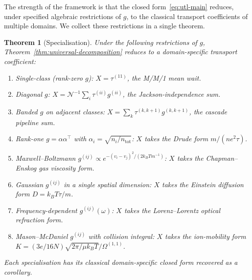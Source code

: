 \documentclass[twocolumn,11pt,a4paper]{article}
\newtheorem{theorem}{Theorem}[section]
\newcommand{\TP}{X}
\newcommand{\Norm}{\mathcal{N}}
\newcommand{\lag}{\tau}
\newcommand{\cpl}{g}
\begin{document}
The strength of the framework is that the closed form~\eqref{eq:utl-main} reduces, under specified algebraic restrictions of $\cpl$, to the classical transport coefficients of multiple domains. We collect these restrictions in a single theorem.

\begin{theorem}[Specialisation]
\label{thm:specialisation}
Under the following restrictions of $\cpl$, Theorem~\ref{thm:universal-decomposition} reduces to a domain-specific transport coefficient:
\begin{enumerate}[nosep,leftmargin=*]
\item Single-class (rank-zero $\cpl$): $\TP = \lag^{(11)}$, the M/M/1 mean wait.
\item Diagonal $\cpl$: $\TP = \Norm^{-1} \sum_i \lag^{(ii)} \cpl^{(ii)}$, the Jackson-independence sum.
\item Banded $\cpl$ on adjacent classes: $\TP = \sum_k \lag^{(k,k+1)} \cpl^{(k,k+1)}$, the cascade pipeline sum.
\item Rank-one $\cpl = \alpha \alpha^\top$ with $\alpha_i = \sqrt{n_i / n_\mathrm{tot}}$: $\TP$ takes the Drude form $m / (n e^2 \tau)$.
\item Maxwell--Boltzmann $\cpl^{(ij)} \propto e^{-(v_i - v_j)^2 / (2 k_B T m^{-1})}$: $\TP$ takes the Chapman--Enskog gas viscosity form.
\item Gaussian $\cpl^{(ij)}$ in a single spatial dimension: $\TP$ takes the Einstein diffusion form $D = k_B T \lag / m$.
\item Frequency-dependent $\cpl^{(ij)}(\omega)$: $\TP$ takes the Lorenz--Lorentz optical refraction form.
\item Mason--McDaniel $\cpl^{(ij)}$ with collision integral: $\TP$ takes the ion-mobility form $K = (3 e / 16 N) \sqrt{2\pi / \mu k_B T} / \Omega^{(1,1)}$.
\end{enumerate}
Each specialisation has its classical domain-specific closed form recovered as a corollary.
\end{theorem}
\end{document}
